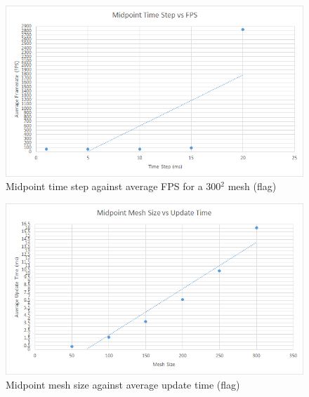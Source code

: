     \begin{figure}
    \begin{center}
      \includegraphics[scale=.9]{Figures/flag_m_ts_fps}
    \end{center}
    \caption{Midpoint time step against average FPS for a 300$^{2}$ mesh (flag)}
    \label{fig:m step fps flag}
  \end{figure}
  
    \begin{figure}
    \begin{center}
      \includegraphics[scale=.9]{Figures/flag_m_m_ut}
    \end{center}
    \caption{Midpoint mesh size against average update time (flag)}
    \label{fig:m mesh update flag}
  \end{figure}
  
